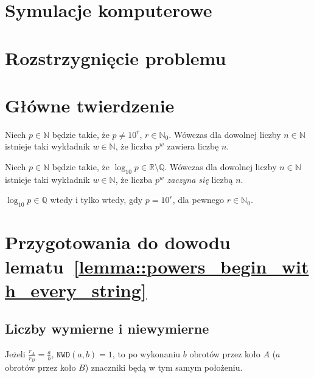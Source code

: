 \documentclass[aspectratio=169]{beamer}
\newcommand{\R}{\mathbb{R}}
\newcommand{\Q}{\mathbb{Q}}
\newcommand{\N}{\mathbb{N}}
\renewcommand{\gcd}[2]{\mathtt{NWD}\paren{#1, #2}}
\newcommand{\importFromTmpData}[1]{{#1}}
\newcommand{\labelOnSlide}[2]{\label<#1>{#2}}
\newcommand{\define}[1]{\textcolor{colorOfDefinition}{\textit{#1}}}
\newcommand{\paren}[1]{\!\left(#1 \right)}
\newcommand{\goToProof}[1]{\hfill\hyperlink{#1}{\normalfont\faArrowCircleRight}}
\begin{document}
\section{Symulacje komputerowe}

\importFromTmpData{\expSubstrPlotsTex}

\section{Rozstrzygnięcie problemu}
\section{Główne twierdzenie}

\begin{frame}
  \pause{}
  \begin{theorem}
    Niech $p \in \N$ będzie takie, że $p \not = 10^r$, $r \in \N_0$.
    Wówczas dla dowolnej liczby $n \in \N$ istnieje taki wykładnik $w \in \N$, że liczba $p^w$ zawiera liczbę $n$.
  \end{theorem}
  \pause{}
  \begin{lemma}
    \labelOnSlide{4}{lemma::powers_begin_with_every_string}
    Niech $p \in \N$ będzie takie, że $\log_{10}p \in \R \setminus \Q$.
    Wówczas dla dowolnej liczby $n \in \N$ istnieje taki wykładnik $w \in \N$, że liczba $p^w$ \define{zaczyna się} liczbą $n$. \goToProof{proof::lemma::powers_begin_with_every_string}
  \end{lemma}
  \pause{}
  \begin{lemma}
    \labelOnSlide{4}{lemma::log_10_rational_iff}
    $\log_{10}p \in \Q$ wtedy i tylko wtedy, gdy $p = 10^r$, dla pewnego $r \in \N_0$.
    \goToProof{proof::lemma::log_10_rational_iff}
  \end{lemma}
\end{frame}

\section{\texorpdfstring{Przygotowania do dowodu lematu~\protect\ref{lemma::powers_begin_with_every_string}}{Przygotowania do dowodu głównego lematu}}
\subsection{Liczby wymierne i niewymierne}

\begin{frame}
  \begin{figure}
    \importFromTmpData{\wheelsRationalTex}
  \end{figure}
  \begin{theorem}
  Jeżeli $\frac{r_A}{r_B} = \frac{a}{b}$, $\gcd{a}{b} = 1$, to po wykonaniu $b$ obrotów przez koło $A$ ($a$ obrotów przez koło $B$)
  \textcolor{\wheelMarkerColor}{znaczniki} będą w tym samym położeniu.
  \end{theorem}
\end{frame}
\end{document}

